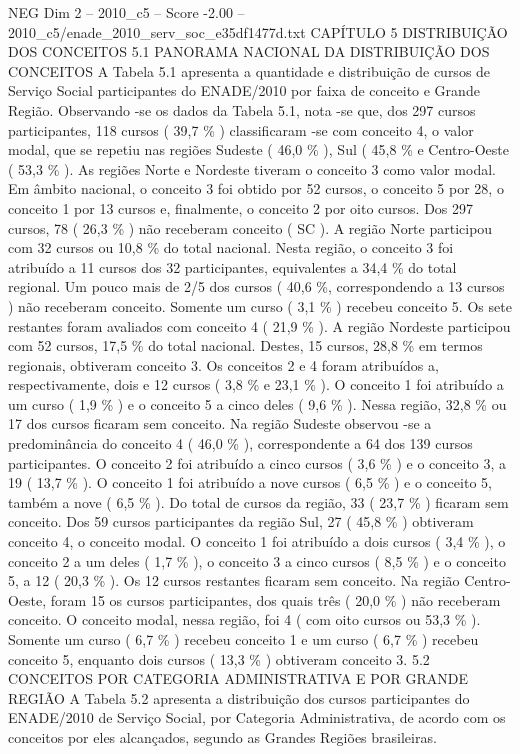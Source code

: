 \begin{textsample}{NEG Dim 2 – 2010\_c5 – Score -2.00 – 2010\_c5/enade\_2010\_serv\_soc\_e35df1477d.txt}  \label{ex:f2_neg_104}
CAPÍTULO 5 DISTRIBUIÇÃO DOS CONCEITOS 5.1 PANORAMA NACIONAL DA DISTRIBUIÇÃO DOS CONCEITOS A Tabela 5.1 apresenta a quantidade e distribuição de cursos de Serviço Social participantes do ENADE/2010 por faixa de conceito e Grande Região.
Observando -se os dados da Tabela 5.1, nota -se que, dos 297 cursos participantes, 118 cursos ( 39,7 \% ) classificaram -se com conceito 4, o valor modal, que se repetiu nas regiões Sudeste ( 46,0 \% ), Sul ( 45,8 \% e Centro-Oeste ( 53,3 \% ).
As regiões Norte e Nordeste tiveram o conceito 3 como valor modal.
Em âmbito nacional, o conceito 3 foi obtido por 52 cursos, o conceito 5 por 28, o conceito 1 por 13 cursos e, finalmente, o conceito 2 por oito cursos.
Dos 297 cursos, 78 ( 26,3 \% ) não receberam conceito ( SC ).
A região Norte participou com 32 cursos ou 10,8 \% do total nacional.
Nesta região, o conceito 3 foi atribuído a 11 cursos dos 32 participantes, equivalentes a 34,4 \% do total regional.
Um pouco mais de 2/5 dos cursos ( 40,6 \%, correspondendo a 13 cursos ) não receberam conceito.
Somente um curso ( 3,1 \% ) recebeu conceito 5.
Os sete restantes foram avaliados com conceito 4 ( 21,9 \% ).
A região Nordeste participou com 52 cursos, 17,5 \% do total nacional.
Destes, 15 cursos, 28,8 \% em termos regionais, obtiveram conceito 3.
Os conceitos 2 e 4 foram atribuídos a, respectivamente, dois e 12 cursos ( 3,8 \% e 23,1 \% ).
O conceito 1 foi atribuído a um curso ( 1,9 \% ) e o conceito 5 a cinco deles ( 9,6 \% ).
Nessa região, 32,8 \% ou 17 dos cursos ficaram sem conceito.
Na região Sudeste observou -se a predominância do conceito 4 ( 46,0 \% ), correspondente a 64 dos 139 cursos participantes.
O conceito 2 foi atribuído a cinco cursos ( 3,6 \% ) e o conceito 3, a 19 ( 13,7 \% ).
O conceito 1 foi atribuído a nove cursos ( 6,5 \% ) e o conceito 5, também a nove ( 6,5 \% ).
Do total de cursos da região, 33 ( 23,7 \% ) ficaram sem conceito.
Dos 59 cursos participantes da região Sul, 27 ( 45,8 \% ) obtiveram conceito 4, o conceito modal.
O conceito 1 foi atribuído a dois cursos ( 3,4 \% ), o conceito 2 a um deles ( 1,7 \% ), o conceito 3 a cinco cursos ( 8,5 \% ) e o conceito 5, a 12 ( 20,3 \% ).
Os 12 cursos restantes ficaram sem conceito.
Na região Centro-Oeste, foram 15 os cursos participantes, dos quais três ( 20,0 \% ) não receberam conceito.
O conceito modal, nessa região, foi 4 ( com oito cursos ou 53,3 \% ).
Somente um curso ( 6,7 \% ) recebeu conceito 1 e um curso ( 6,7 \% ) recebeu conceito 5, enquanto dois cursos ( 13,3 \% ) obtiveram conceito 3. 5.2 CONCEITOS POR CATEGORIA ADMINISTRATIVA E POR GRANDE REGIÃO A Tabela 5.2 apresenta a distribuição dos cursos participantes do ENADE/2010 de Serviço Social, por Categoria Administrativa, de acordo com os conceitos por eles alcançados, segundo as Grandes Regiões brasileiras.

\end{textsample}
